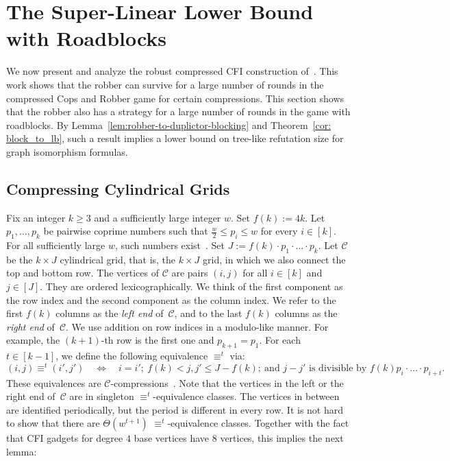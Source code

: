 \documentclass[a4paper,english, thm-restate]{lipics-v2021}
\newcommand{\defining}[1]{\emph{#1}}
\newcommand{\comp}{\equiv}
\newcommand{\grid}{\mathcal{C}}
\begin{document}
 
\section{The Super-Linear Lower Bound with Roadblocks}
\label{sec:super-linear-lower-bound}
We now present and analyze the robust compressed CFI construction of~\cite{RFJN024}.
This work shows that the robber can survive for a large number of
rounds in the compressed Cops and Robber game for certain
compressions.
This section shows that the robber also has a strategy for a large number of rounds
in the game with roadblocks. By Lemma~\ref{lem:robber-to-duplictor-blocking} and Theorem~\ref{cor: block_to_lb}, such a result implies a lower bound on tree-like refutation size for graph isomorphism formulas.

\subsection{Compressing Cylindrical Grids}
\label{sec:compressing-cylindrical-grids}

Fix an integer $k\geq 3$ and a sufficiently large integer $w$.
Set $f(k) := 4k$. 
Let $p_1,\dots,p_k$
be pairwise coprime numbers such that
$\frac{w}{2} \leq p_i \leq w$
for every $i \in [k]$. For all sufficiently large $w$, such numbers exist~\cite{DBLP:conf/focs/GroheLNS23}.
Set $J := f(k)\cdot p_1\cdot\ldots \cdot p_k$.
Let $\grid$ be the $k \times J$ cylindrical grid,
that is, the $k\times J$ grid, in which we also connect the
top and bottom row.
The vertices of $\grid$ are pairs $(i,j)$ for all $i\in[k]$ and $j \in [J]$. They are ordered lexicographically.
We think of the first component as the row index and the second component as the column index.
We refer to the first $f(k)$ columns
as the \defining{left end} of~$\grid$, and
to the last $f(k)$ columns as the \defining{right end} of~$\grid$.
We use addition on row indices in a modulo-like manner.
For example, the $(k+1)$-th row is the first one and $p_{k+1} = p_1$.
For each  $t \in [k-1]$, we define the following equivalence $\comp^t$ via:
\[(i,j) \comp^{t} (i',j') \quad \Longleftrightarrow \quad i=i';\ f(k) < j,j' \leq J-f(k);\  \text{and } j-j'
\text { is divisible by } f(k)p_i\cdot\ldots \cdot p_{i+t}.\] 
These equivalences are $\grid$-compressions~\cite{RFJN024}.
Note that the vertices in the left or the right end of~$\grid$
are in singleton $\comp^t$-equivalence classes. The vertices in between are identified periodically, but the period is different in every row.
It is not hard to show that there are $\Theta(w^{t+1})$ $\comp^t$-equivalence classes. Together with the fact that CFI gadgets for degree $4$ base vertices have $8$ vertices, this implies the next lemma:
\end{document}

